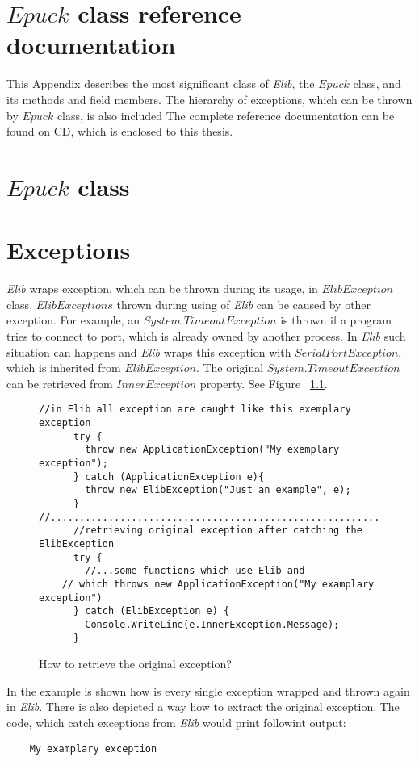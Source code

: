 \chapter{$Epuck$ class reference documentation} \label{app:epuckref}
This Appendix describes the most significant class of {\it Elib}, the $Epuck$ class,
and its methods and field members.
The hierarchy of exceptions, which can be thrown by $Epuck$ class, is also included
The complete reference documentation can be found on CD, which is enclosed
to this thesis.

\chapter*{$Epuck$ class}

\chapter*{Exceptions}
	{\it Elib} wraps exception, which can be thrown during its usage, in $ ElibException$ class.
	$ElibExceptions$ thrown during using of {\it Elib} can be caused by other exception.
	For example, an $System.TimeoutException$ is thrown if a program tries to connect to port, 
	which is already owned by another process.
	In {\it Elib} such situation can happens and {\it Elib} wraps this exception
	with $SerialPortException$, which is inherited from $ElibException$.
	The original $System.TimeoutException$ can be retrieved from $InnerException$ property.
	See Figure ~\ref{exceptionuse}.
\begin{figure}[!hbp]
\begin{lstlisting}
//in Elib all exception are caught like this exemplary exception
      try {
        throw new ApplicationException("My exemplary exception");
      } catch (ApplicationException e){
        throw new ElibException("Just an example", e);
      }
//........................................................................
      //retrieving original exception after catching the ElibException
      try {
        //...some functions which use Elib and 
	// which throws new ApplicationException("My examplary exception")
      } catch (ElibException e) {
        Console.WriteLine(e.InnerException.Message);
      }
\end{lstlisting}
\caption{How to retrieve the original exception?}
\label{exceptionuse}
\end{figure}
	In the example is shown how is every single exception wrapped and thrown again in {\it Elib}.
	There is also depicted a way how to extract the original exception.
	The code, which catch exceptions from {\it Elib} would print followint output:
\begin{verbatim}
	My examplary exception
\end{verbatim}


